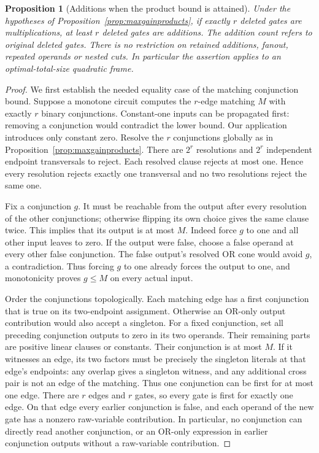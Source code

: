 \documentclass[11pt]{article}
\newtheorem{proposition}[theorem]{Proposition}
\theoremstyle{definition}
\theoremstyle{remark}
\begin{document}
\begin{proposition}[Additions when the product bound is attained]\label{prop:equalproductadditions}
Under the hypotheses of Proposition~\ref{prop:maxgainproducts}, if exactly $r$ deleted gates are multiplications, at least $r$ deleted gates are additions. The addition count refers to original deleted gates. There is no restriction on retained additions, fanout, repeated operands or nested cuts. In particular the assertion applies to an optimal-total-size quadratic frame.
\end{proposition}
\begin{proof}
We first establish the needed equality case of the matching conjunction bound. Suppose a monotone circuit computes the $r$-edge matching $M$ with exactly $r$ binary conjunctions. Constant-one inputs can be propagated first: removing a conjunction would contradict the lower bound. Our application introduces only constant zero. Resolve the $r$ conjunctions globally as in Proposition~\ref{prop:maxgainproducts}. There are $2^r$ resolutions and $2^r$ independent endpoint transversals to reject. Each resolved clause rejects at most one. Hence every resolution rejects exactly one transversal and no two resolutions reject the same one.

Fix a conjunction $g$. It must be reachable from the output after every resolution of the other conjunctions; otherwise flipping its own choice gives the same clause twice. This implies that its output is at most $M$. Indeed force $g$ to one and all other input leaves to zero. If the output were false, choose a false operand at every other false conjunction. The false output's resolved OR cone would avoid $g$, a contradiction. Thus forcing $g$ to one already forces the output to one, and monotonicity proves $g\le M$ on every actual input.

Order the conjunctions topologically. Each matching edge has a first conjunction that is true on its two-endpoint assignment. Otherwise an OR-only output contribution would also accept a singleton. For a fixed conjunction, set all preceding conjunction outputs to zero in its two operands. Their remaining parts are positive linear clauses or constants. Their conjunction is at most $M$. If it witnesses an edge, its two factors must be precisely the singleton literals at that edge's endpoints: any overlap gives a singleton witness, and any additional cross pair is not an edge of the matching. Thus one conjunction can be first for at most one edge. There are $r$ edges and $r$ gates, so every gate is first for exactly one edge. On that edge every earlier conjunction is false, and each operand of the new gate has a nonzero raw-variable contribution. In particular, no conjunction can directly read another conjunction, or an OR-only expression in earlier conjunction outputs without a raw-variable contribution.


\end{proof}
\end{document}
